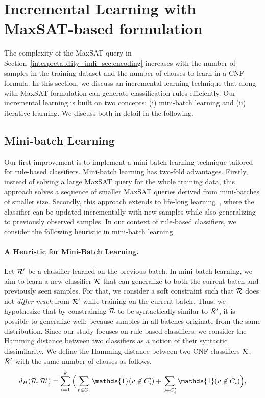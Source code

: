 \section{Incremental Learning with MaxSAT-based formulation}
\label{interpretability_imli_sec:incremental_learning}
The complexity of the MaxSAT query in Section~\ref{interpretability_imli_sec:encoding} increases with the number of samples in the training dataset and the number of clauses to learn in a CNF formula. In this section, we discuss an incremental learning technique that along with MaxSAT formulation can generate classification rules efficiently. Our incremental learning is built on two concepts: (i)
mini-batch learning and (ii) iterative learning. We discuss both in detail in the following.

\subsection{Mini-batch Learning} 

Our first improvement is to implement a mini-batch learning technique tailored for rule-based classifiers. Mini-batch learning has two-fold advantages. Firstly, instead of solving a large MaxSAT query for the whole training data, this approach solves a sequence of smaller MaxSAT queries derived from mini-batches of smaller size.  Secondly, this approach extends to life-long learning~\cite{chen2018lifelong}, where the classifier can be updated incrementally with new samples while also generalizing to previously observed samples. In our context of rule-based classifiers, we consider the following heuristic in mini-batch learning.


\paragraph{A Heuristic for Mini-Batch Learning.} Let $ {\mathcal{R}}' $ be a classifier learned on the previous batch. In mini-batch learning, we aim to learn a new classifier $ {\mathcal{R}} $ that can generalize to both the current batch and previously seen samples. For that, we consider a soft constraint such that $ {\mathcal{R}} $ does not \emph{differ much} from $ {\mathcal{R}}' $ while training on the current batch. Thus, we hypothesize that by constraining $ {\mathcal{R}} $ to be syntactically similar to $ {\mathcal{R}}' $, it is possible to generalize well; because samples in all batches originate from the same distribution. Since our study focuses on rule-based classifiers, we consider the Hamming distance between two classifiers as a notion of their syntactic dissimilarity. We define the Hamming distance between two CNF classifiers $ {\mathcal{R}} $, $ {\mathcal{R}}' $ with the same number of clauses as follows.
\[
	d_{H}(\Rule, \Rule') = \sum_{i=1}^k \Big(\sum_{v\in C_i} \mathds{1}(v \not\in C'_i) +  \sum_{v\in C'_i} \mathds{1}(v \not\in C_i) \Big), 
\]
 
